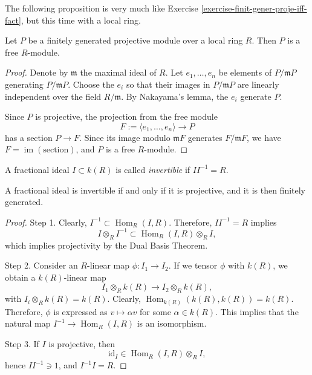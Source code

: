 \noindent
The following proposition is very
much like Exercise
\ref{exercise-finit-gener-proje-iff-fact},
but this time with a local ring.

\begin{proposition}
\label{proposition-projective-local-free}
Let $P$ be a finitely generated projective
module over a local ring $R$. Then $P$ is a
free $R$-module.
\end{proposition}

\begin{proof}
Denote by $\mathfrak m$ the maximal ideal of
$R$. Let $e_1,\ldots,e_n$ be elements of
$P/\mathfrak m P$ generating $P/\mathfrak m P$.
Choose the $e_i$ so that their images in
$P/\mathfrak m P$ are linearly independent
over the field $R/\mathfrak m$.
By Nakayama's lemma, the $e_i$ generate $P$.

Since $P$ is projective, the projection from
the free module
$$
F:=\langle e_1,\ldots,e_n\rangle
\to P
$$
has a section $P\to F$.
Since its image modulo $\mathfrak m F$
generates $F/\mathfrak m F$, we have
$F=\operatorname{im}(\text{section})$,
and $P$ is a free $R$-module.
\end{proof}

\begin{definition}
\label{definition-invertible-fractional-ideal}
A fractional ideal $I\subset k(R)$ is
called {\it invertible} if
$II^{-1}=R$.
\end{definition}

\begin{theorem}
\label{theorem-invertible-fractional-ideal}
A fractional ideal is invertible if and only
if it is projective, and it is then finitely
generated.
\end{theorem}

\begin{proof}
Step 1. Clearly,
$I^{-1}\subset \operatorname{Hom}_R(I,R)$.
Therefore, $II^{-1}=R$ implies
$$
I\otimes_R I^{-1}\subset
\operatorname{Hom}_R(I,R)\otimes_R I,
$$
which implies projectivity by the Dual Basis
Theorem.

Step 2. Consider an $R$-linear map
$\phi:I_1\to I_2$. If we tensor $\phi$ with
$k(R)$, we obtain a $k(R)$-linear map
$$
I_1\otimes_R k(R)\to I_2\otimes_R k(R),
$$
with $I_i\otimes_R k(R)=k(R)$.
Clearly,
$\operatorname{Hom}_{k(R)}(k(R),k(R))=k(R)$.
Therefore, $\phi$ is expressed as
$v\mapsto \alpha v$ for some
$\alpha\in k(R)$.
This implies that the natural map
$I^{-1}\to \operatorname{Hom}_R(I,R)$ is an
isomorphism.

Step 3. If $I$ is projective, then
$$
\text{id}_I \in
\operatorname{Hom}_R(I,R)\otimes_R I,
$$
hence $II^{-1}\ni 1$, and $I^{-1}I=R$.
\end{proof}

